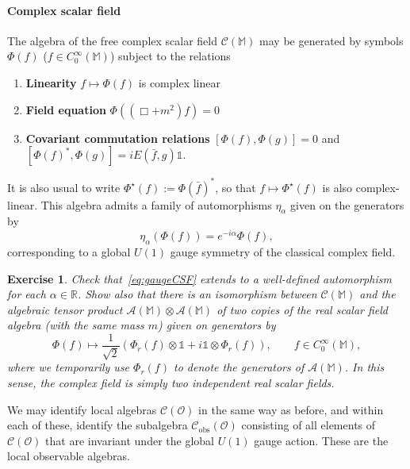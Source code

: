 \documentclass[12pt]{article}
\newcommand{\1}{\mathds{1}}                         %
\newcommand{\RR}{\mathbb{R}}           %
\newcommand{\Ocal}{\mathcal{O}}
\newcommand{\MM}{\mathbb{M}}
\newcommand{\II}{{\mathbb{1}}}
\newcommand{\Ac}{{\mathcal{A}}}
\newcommand{\Cc}{{\mathcal{C}}}
\newcommand{\CoinX}[1]{C_0^\infty(#1)}
\newtheorem{exercise}[theorem]{Exercise}
\begin{document}
	\paragraph{Complex scalar field} The algebra of the free complex scalar field $\Cc(\MM)$
	may be generated by symbols $\Phi(f)$ ($f\in\CoinX{\MM}$) subject to the relations
	\begin{enumerate}[label=\bf CF\arabic{enumi},leftmargin=*,widest=4] 
		\item\label{it:CFfieldcong} {\bf Linearity} $f\mapsto \Phi(f)$ is complex linear 
		\item\label{it:CFfieldeq} {\bf Field equation} $\Phi((\Box+ m^2)f)= 0$ 
		\item\label{it:CFfieldcom} {\bf Covariant commutation relations} $[\Phi(f),\Phi(g)]=0$ and $[\Phi(f)^*,\Phi(g)] = iE (\bar{f},g)\II$.
	\end{enumerate}
	It is also usual to write $\Phi^\star(f):=\Phi(\bar{f})^*$, so that $f\mapsto\Phi^\star(f)$ is  also complex-linear. This algebra admits a family of automorphisms $\eta_\alpha$ given on the generators by 
	\begin{equation}\label{eq:gaugeCSF}
	\eta_\alpha(\Phi(f))= e^{-i\alpha} \Phi(f),
	\end{equation}
	corresponding to a global $U(1)$ gauge symmetry of the classical complex field.  
	\begin{exercise}
	Check that~\eqref{eq:gaugeCSF} extends to a well-defined automorphism for each $\alpha\in\RR$. Show also that there is an isomorphism between $\Cc(\MM)$ and
	the algebraic tensor product $\Ac(\MM)\otimes\Ac(\MM)$ of two copies of the real scalar field algebra (with the same mass $m$) given on generators by  
	\[
	\Phi(f)\mapsto \frac{1}{\sqrt{2}}\left(\Phi_r(f)\otimes \II+i \II\otimes \Phi_r(f) \right), \qquad f\in\CoinX{\MM},
	\]
	where we temporarily use $\Phi_r(f)$ to denote the generators of $\Ac(\MM)$. In this sense, the complex field is simply two independent real scalar fields.	
	\end{exercise}
	We may identify local algebras $\Cc(\Ocal)$ in the same way as before, and within each of these, identify the subalgebra $\Cc_{\text{obs}}(\Ocal)$ consisting of all elements
	of $\Cc(\Ocal)$ that are invariant under the global $U(1)$ gauge action. These are the local observable algebras. 
	
\end{document}

